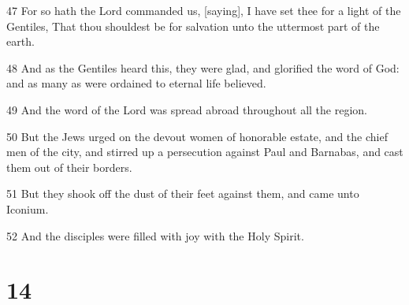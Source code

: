 \par 47 For so hath the Lord commanded us, [saying], I have set thee for a light of the Gentiles, That thou shouldest be for salvation unto the uttermost part of the earth.
\par 48 And as the Gentiles heard this, they were glad, and glorified the word of God: and as many as were ordained to eternal life believed.
\par 49 And the word of the Lord was spread abroad throughout all the region.
\par 50 But the Jews urged on the devout women of honorable estate, and the chief men of the city, and stirred up a persecution against Paul and Barnabas, and cast them out of their borders.
\par 51 But they shook off the dust of their feet against them, and came unto Iconium.
\par 52 And the disciples were filled with joy with the Holy Spirit.

\chapter{14}

